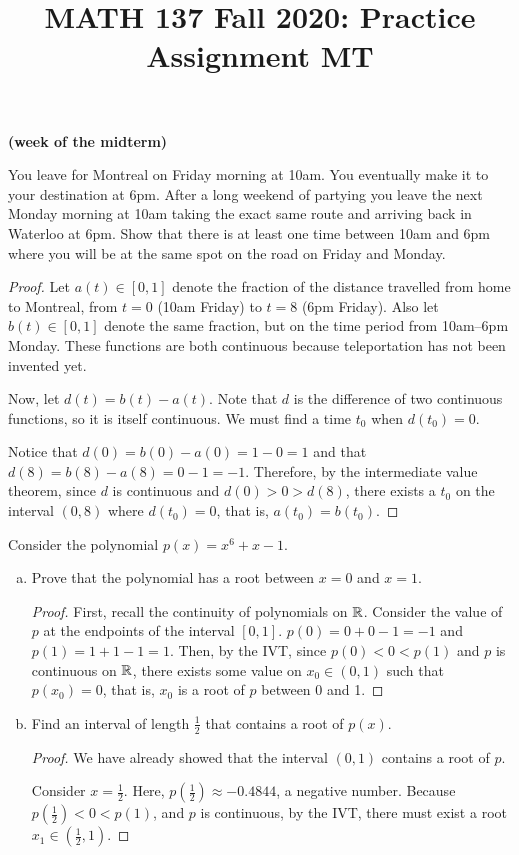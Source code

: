 
\title{MATH 137 Fall 2020: Practice Assignment MT}


\thispagestyle{firstpage}

\textbf{\@title{} (week of the midterm)}

\question You leave for Montreal on Friday morning at 10am.
You eventually make it to your destination at 6pm.
After a long weekend of partying you leave the next Monday morning at 10am taking the exact same route and arriving back in Waterloo at 6pm.
Show that there is at least one time between 10am and 6pm where you will be at the same spot on the road on Friday and Monday.

\begin{proof}
  Let $a(t) \in [0,1]$ denote the fraction of the distance travelled from home to Montreal,
  from $t=0$ (10am Friday) to $t=8$ (6pm Friday).
  Also let $b(t) \in [0,1]$ denote the same fraction, but on the time period from 10am--6pm Monday.
  These functions are both continuous because teleportation has not been invented yet.

  Now, let $d(t) = b(t) - a(t)$.
  Note that $d$ is the difference of two continuous functions, so it is itself continuous.
  We must find a time $t_0$ when $d(t_0) = 0$.

  Notice that $d(0) = b(0) - a(0) = 1 - 0 = 1$ and that $d(8) = b(8) - a(8) = 0 - 1 = -1$.
  Therefore, by the intermediate value theorem, since $d$ is continuous and $d(0) > 0 > d(8)$,
  there exists a $t_0$ on the interval $(0,8)$ where $d(t_0) = 0$, that is, $a(t_0) = b(t_0)$.
\end{proof}

\question Consider the polynomial $p(x)=x^6+x-1$.
\begin{enumerate}[(a)]
  \item Prove that the polynomial has a root between $x=0$ and $x=1$.
        \begin{proof}
          First, recall the continuity of polynomials on $\mathbb{R}$.
          Consider the value of $p$ at the endpoints of the interval $[0,1]$.
          $p(0) = 0+0-1 = -1$ and $p(1) = 1+1-1 = 1$.
          Then, by the IVT, since $p(0) < 0 < p(1)$ and $p$ is continuous on $\mathbb{R}$,
          there exists some value on $x_0\in(0,1)$ such that $p(x_0)=0$, that is,
          $x_0$ is a root of $p$ between 0 and 1.
        \end{proof}
  \item Find an interval of length $\frac{1}{2}$ that contains a root of $p(x)$.
        \begin{proof}
          We have already showed that the interval $(0,1)$ contains a root of $p$.

          Consider $x=\frac12$. Here, $p(\frac12)\approx-0.4844$, a negative number.
          Because $p(\frac12) < 0 < p(1)$, and $p$ is continuous, by the IVT,
          there must exist a root $x_1\in(\frac12,1)$.
        \end{proof}
\end{enumerate}

